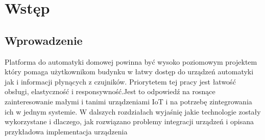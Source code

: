 \chapter{Wstęp}
\section{Wprowadzenie}
Platforma do automatyki domowej powinna być wysoko poziomowym projektem który pomaga użytkownikom budynku w łatwy dostęp do urządzeń automatyki jak i informacji płynących z czujników. Priorytetem tej pracy jest łatwość obsługi, elastyczność i responsywność.Jest to odpowiedź na rosnące zainteresowanie małymi i tanimi urządzeniami IoT i na potrzebę zintegrowania ich w jednym systemie. W dalszych rozdziałach wyjaśnię jakie technologie zostały wykorzystane i dlaczego, jak rozwiązano problemy integracji urządzeń i opisana przykładowa implementacja urządzenia

